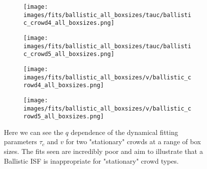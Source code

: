 \documentclass[10pt]{article}
\begin{document}
\begin{figure}[H]
\begin{subfigure}[t]{.5\textwidth}
  \centering
 \texttt{[image: images/fits/ballistic\_all\_boxsizes/tauc/ballistic\_crowd4\_all\_boxsizes.png]}
  \caption{}
\end{subfigure}%
\hfill
\begin{subfigure}[t]{.5\textwidth}
  \centering
  \texttt{[image: images/fits/ballistic\_all\_boxsizes/tauc/ballistic\_crowd5\_all\_boxsizes.png]}
  \caption{}
\end{subfigure}
\label{fig:crowd_ballistic_fits_tauc_all_boxsizes}
\par\bigskip
\begin{subfigure}[t]{.5\textwidth}
  \centering
 \texttt{[image: images/fits/ballistic\_all\_boxsizes/v/ballistic\_crowd4\_all\_boxsizes.png]}
  \caption{}
\end{subfigure}%
\hfill
\begin{subfigure}[t]{.5\textwidth}
  \centering
  \texttt{[image: images/fits/ballistic\_all\_boxsizes/v/ballistic\_crowd5\_all\_boxsizes.png]}
  \caption{}
\end{subfigure}
\caption{Here we can see the $q$ dependence of the dynamical fitting parameters $\tau_c$ and $v$ for two "stationary" crowds at a range of box sizes. The fits seen are incredibly poor and aim to illustrate that a Ballistic ISF is inappropriate for "stationary" crowd types.}
\label{fig:crowd_ballistic_fits_v_all_boxsizes}
\end{figure}

\begin{figure}[H]

\end{figure}
\end{document}
